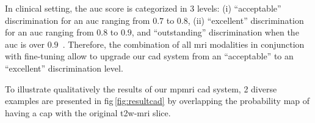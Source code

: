 In clinical setting, the \ac{auc} score is categorized in 3 levels: (i) ``acceptable'' discrimination for an \ac{auc} ranging from $0.7$ to $0.8$, (ii) ``excellent'' discrimination for an \ac{auc} ranging from $0.8$ to $0.9$, and ``outstanding'' discrimination when the \ac{auc} is over $0.9$~\cite{hosmer2004applied}.
Therefore, the combination of all \ac{mri} modalities in conjunction with fine-tuning allow to upgrade our \ac{cad} system from an ``acceptable'' to an ``excellent'' discrimination level.

To illustrate qualitatively the results of our \ac{mpmri} \ac{cad} system, 2 diverse examples are presented in \acs{fig}\,\ref{fig:resultcad} by overlapping the probability map of having a \ac{cap} with the original \ac{t2w}-\ac{mri} slice.
